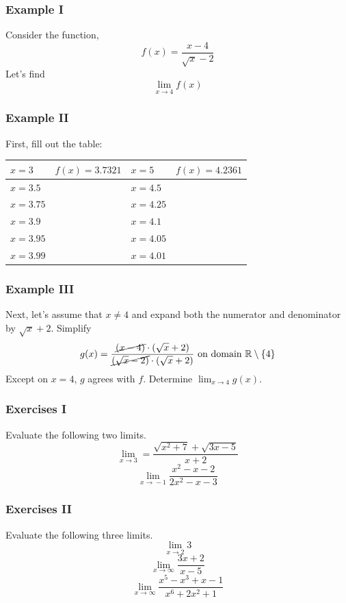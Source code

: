 \documentclass[xcolor=dvipsnames]{beamer}
\begin{document}
\begin{frame}
  \frametitle{Example I}
Consider the function,
\begin{equation}
  \label{eq:shuungae}
  f(x)=\frac{x-4}{\sqrt{x}-2}
\end{equation}
Let's find
\begin{equation}
  \label{eq:ailuiquo}
  \lim_{x\rightarrow{}4}f(x)
\end{equation}
\end{frame}

\begin{frame}
  \frametitle{Example II}
First, fill out the table:

\begin{tabular}{|l|l|l|l|}\hline
  $x=3$ & $f(x)= 3.7321$ & $x=5$ & $f(x)=4.2361$ \\ \hline
  $x=3.5$ & & $x=4.5$ &  \\ \hline
  $x=3.75$ & & $x=4.25$ & \\ \hline
  $x=3.9$ &  & $x=4.1$ & \\ \hline
  $x=3.95$ & & $x=4.05$ & \\ \hline
  $x=3.99$ & & $x=4.01$ & \\ \hline
\end{tabular}
\end{frame}

\begin{frame}
  \frametitle{Example III}
Next, let's assume that $x\neq{}4$ and expand both the numerator
and denominator by $\sqrt{x}+2$. Simplify
\begin{equation}
  \label{eq:oudiolee}
  g(x)=\frac{\cancel{(x-4)}\cdot(\sqrt{x}+2)}{\cancel{(\sqrt{x}-2)}\cdot(\sqrt{x}+2)}\mbox{ on domain }\mathbb{R}\setminus\{4\}
\end{equation}
Except on $x=4$, $g$ agrees with $f$. Determine
$\lim_{x\rightarrow{}4}g(x)$.
\end{frame}

\begin{frame}
  \frametitle{Exercises I}
Evaluate the following two limits.
\begin{equation}
  \label{eq:uheafaix}
  \lim_{x\rightarrow{}3}=\frac{\sqrt{x^{2}+7}+\sqrt{3x-5}}{x+2}
\end{equation}
\begin{equation}
  \label{eq:azeeghee}
  \lim_{x\rightarrow{}-1}\frac{x^{2}-x-2}{2x^{2}-x-3}
\end{equation}
\end{frame}

\begin{frame}
  \frametitle{Exercises II}
Evaluate the following three limits.
\begin{equation}
  \label{eq:haeceema}
  \lim_{x\rightarrow{}2}3
\end{equation}
\begin{equation}
  \label{eq:aogedish}
  \lim_{x\rightarrow\infty}\frac{3x+2}{x-5}
\end{equation}
\begin{equation}
  \label{eq:xaebiaph}
  \lim_{x\rightarrow\infty}\frac{x^{5}-x^{3}+x-1}{x^{6}+2x^{2}+1}
\end{equation}
\end{frame}
\end{document}
